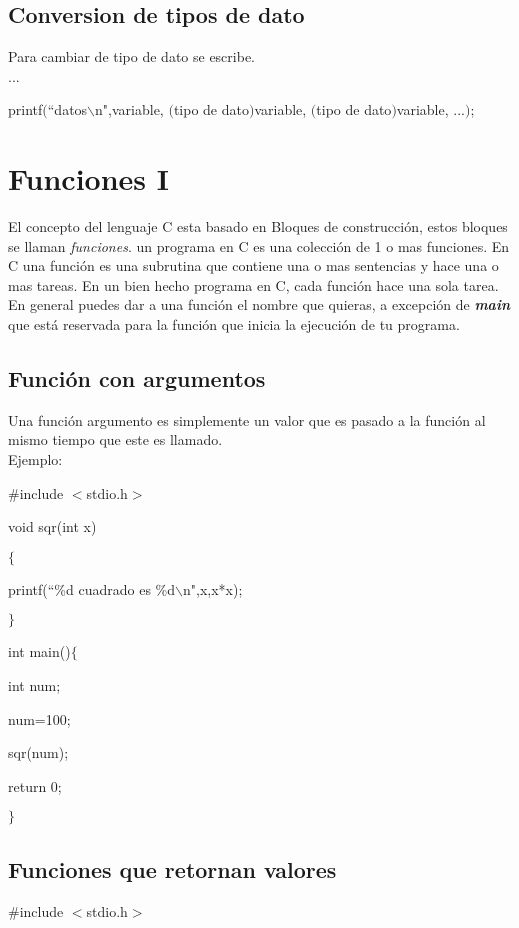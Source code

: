 \documentclass[]{article}
\begin{document}
	\subsection{Conversion de tipos de dato}
	Para cambiar de tipo de dato se escribe.\\
	
	...
	
	printf$($``datos$\backslash$n",variable, $($tipo de dato$)$variable, $($tipo de dato$)$variable, ...$)$;
	
	\section{Funciones I}
	El concepto del lenguaje C esta basado en Bloques de construcción, estos bloques se llaman \textit{funciones}. un programa en C es una colección de 1 o mas funciones. En C una función es una subrutina que contiene una o mas sentencias y hace una o mas tareas. En un bien hecho programa en C, cada función hace una sola tarea.\\
	
	En general puedes dar a una función el nombre que quieras, a excepción de \textit{\textbf{main}} que está reservada para la función que inicia la ejecución de tu programa.
	
	\subsection{Función con argumentos}
	Una función argumento es simplemente un valor que es pasado a la función al mismo tiempo que este es llamado.\\
	
	Ejemplo:
	
	\#include $<$stdio.h$>$
	
	void sqr(int x)
	
	$\lbrace$
	
	printf(``\%d cuadrado es \%d$\backslash$n",x,x*x);
	
	$\rbrace$
	
	int main()$\lbrace$
	
	int num;
	
	num=100;
	
	sqr(num);
	
	return 0;
	
	$\rbrace$
	
	\subsection{Funciones que retornan valores}
	\#include $<$stdio.h$>$
	
\end{document}

